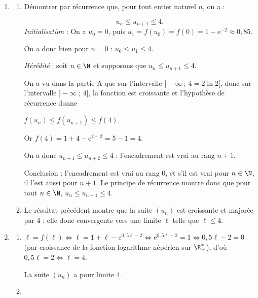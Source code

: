 \medskip

\begin{enumerate}
\item 
	\begin{enumerate}
		\item Démontrer par récurrence que, pour tout entier naturel $n$, on a : 

		\[u_n \leqslant u_{n+1} \leqslant 4.\]
\emph{Initialisation } : On a $u_0 = 0$, puis $u_1 = f\left(u_0\right) = f(0) = 1 - \text{e}^{-2} \approx 0,85$.

On a donc bien pour $n= 0$ : $u_0 \leqslant u_1 \leqslant 4$.

\emph{Hérédité} : soit $n \in \N$ et supposons que $u_n \leqslant u_{n+1} \leqslant 4$.

On a vu dans la partie A que sur l'intervalle $]- \infty~;~4 = 2\ln 2[$, donc sur l'intervalle $]- \infty~;~4[$, la fonction est croissante et l'hypothèse de récurrence donne

$f\left(u_n \right) \leqslant f\left(u_{n+1} \right) \leqslant f(4)$.

Or $f(4) = 1 + 4 - \text{e}^{2 - 2} = 5 -1 = 4$.

On a donc $u_{n+1} \leqslant u_{n+2} \leqslant 4$ : l'encadrement est vrai au rang $n + 1$.

Conclusion : l'encadrement est vrai au rang 0, et s'il est vrai pour $n \in \N$, il l'est aussi pour $n + 1$.
Le principe de récurrence montre donc que pour tout $n \in \N$, \: $u_n \leqslant u_{n+1} \leqslant 4$.
		
		\item %

Le résultat précédent montre que la suite $\left(u_n\right)$ est croissante et majorée par 4 : elle donc convergente vers une limite $\ell$ telle que $\ell \leqslant 4$.
	\end{enumerate}	
\item 
	\begin{enumerate}
		\item %
		
$\ell = f(\ell) \iff \ell = 1 + \ell - \text{e}^{0,5\ell - 2} \iff \text{e}^{0,5\ell - 2} = 1 \iff 0,5\ell - 2 = 0$ (par croissance de la fonction logarithme népérien sur $\R_{+}^*$), d'où $0,5\ell = 2 \iff \ell = 4$.

La suite $\left(u_n\right)$ a pour limite 4.
		\item ~
		

\end{enumerate}
\end{enumerate}
